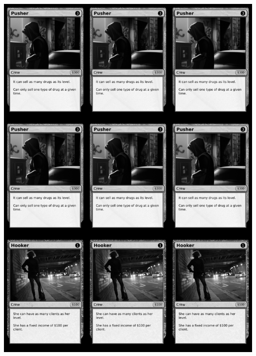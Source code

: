 \documentclass[a4paper]{article}
\begin{document}
\begin{center}
	\centering
	\includegraphics[width=190.5mm,height=266.7mm]{output/temp/page12.png}
\end{center}

\newpage
\end{document}
